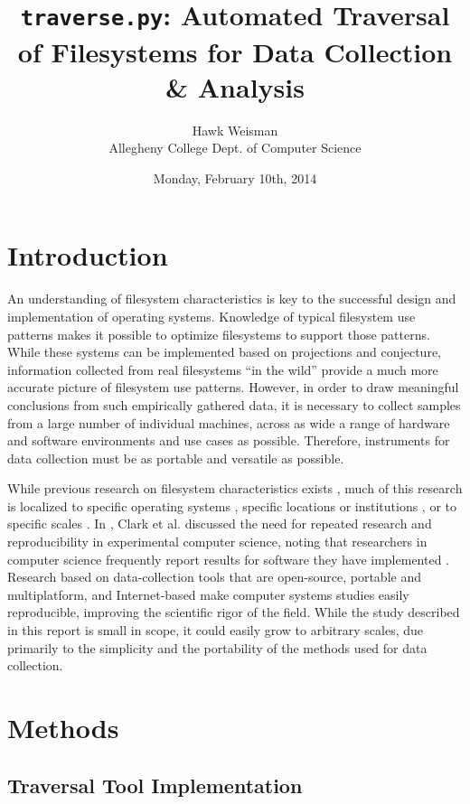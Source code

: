 \documentclass[12pt,a4paper]{article}
\author{Hawk Weisman\\Allegheny College Dept. of Computer Science}
\title{\texttt{traverse.py}: Automated Traversal of Filesystems for Data Collection \& Analysis}
\date{Monday, February 10th, 2014}
\begin{document}
	\maketitle
	\tableofcontents
	\section{Introduction}
		
		An understanding of filesystem characteristics is key to the successful design and implementation of operating systems. Knowledge of typical filesystem use patterns makes it possible to optimize filesystems to support those patterns. While these systems can be implemented based on projections and conjecture, information collected from real filesystems ``in the wild'' provide a much more accurate picture of filesystem use patterns. However, in order to draw meaningful conclusions from such empirically gathered data, it is necessary to collect samples from a large number of individual machines, across as wide a range of hardware and software environments and use cases as possible. Therefore, instruments for data collection must be as portable and versatile as possible.

		While previous research on filesystem characteristics exists \cite{agrawal2007five,evans2002study,leung2008measurement}, much of this research is localized to specific operating systems \cite{agrawal2007five}, specific locations or institutions \cite{agrawal2007five,evans2002study}, or to specific scales \cite{leung2008measurement}. In \citeyear{clark2004xen}, Clark et al. discussed the need for repeated research and reproducibility in experimental computer science, noting that researchers in computer science frequently report results for software they have implemented \cite{clark2004xen}. Research based on data-collection tools that are open-source, portable and multiplatform, and Internet-based make computer systems studies easily reproducible, improving the scientific rigor of the field. While the study described in this report is small in scope, it could easily grow to arbitrary scales, due primarily to the simplicity and the portability of the methods used for data collection.

	\section{Methods}

		\subsection{Traversal Tool Implementation}
\end{document}
